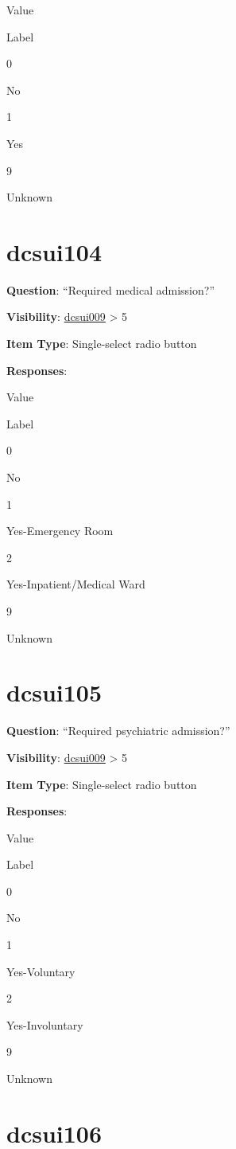 \documentclass[]{book}
\begin{document}
Value

Label

0

No

1

Yes

9

Unknown

\hypertarget{dcsui104}{%
\section{dcsui104}\label{dcsui104}}

\textbf{Question}: ``Required medical admission?''

\textbf{Visibility}: \protect\hyperlink{dcsui009}{dcsui009} \textgreater{} 5

\textbf{Item Type}: Single-select radio button

\textbf{Responses}:

Value

Label

0

No

1

Yes-Emergency Room

2

Yes-Inpatient/Medical Ward

9

Unknown

\hypertarget{dcsui105}{%
\section{dcsui105}\label{dcsui105}}

\textbf{Question}: ``Required psychiatric admission?''

\textbf{Visibility}: \protect\hyperlink{dcsui009}{dcsui009} \textgreater{} 5

\textbf{Item Type}: Single-select radio button

\textbf{Responses}:

Value

Label

0

No

1

Yes-Voluntary

2

Yes-Involuntary

9

Unknown

\hypertarget{dcsui106}{%
\section{dcsui106}\label{dcsui106}}
\end{document}
